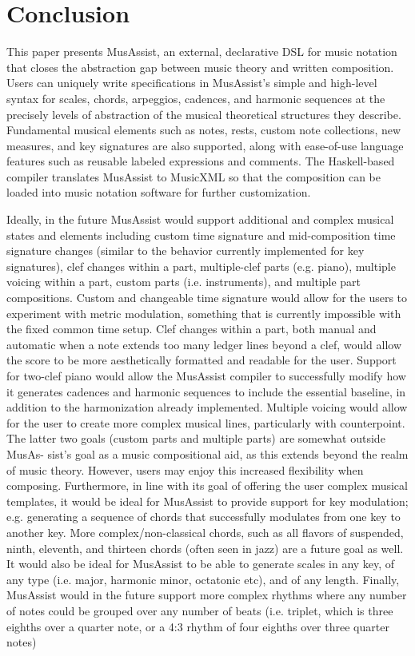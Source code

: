 \documentclass{article}
\begin{document}
\section{Conclusion}
This paper presents MusAssist, an external, declarative DSL for music notation that closes the abstraction gap between music theory and written composition. Users can uniquely write specifications in MusAssist's simple and high-level syntax for scales, chords, arpeggios, cadences, and harmonic sequences at the precisely levels of abstraction of the musical theoretical structures they describe. Fundamental musical elements such as notes, rests, custom note collections, new measures, and key signatures are also supported, along with ease-of-use language features such as reusable labeled expressions and comments. The Haskell-based compiler translates MusAssist to MusicXML so that the composition can be loaded into music notation software for further customization. 


Ideally, in the future MusAssist would support additional and  complex musical states and elements including
custom time signature and mid-composition time signature changes (similar to the behavior
currently implemented for key signatures), clef changes within a part, multiple-clef parts (e.g.
piano), multiple voicing within a part, custom parts (i.e. instruments), and multiple part compositions.
Custom and changeable time signature would allow for the users to experiment with metric modulation,
something that is currently impossible with the fixed common time setup. Clef changes within a
part, both manual and automatic when a note extends too many ledger lines beyond a clef, would
allow the score to be more aesthetically formatted and readable for the user. Support for two-clef piano
would allow the MusAssist compiler to successfully modify how it generates cadences and harmonic
sequences to include the essential baseline, in addition to the harmonization already implemented.
Multiple voicing would allow for the user to create more complex musical lines, particularly with
counterpoint. The latter two goals (custom parts and multiple parts) are somewhat outside MusAs-
sist’s goal as a music compositional aid, as this extends beyond the realm of music theory. However,
users may enjoy this increased flexibility when composing. Furthermore, in line with its goal of
offering the user complex musical templates, it would be ideal for MusAssist to provide support for
key modulation; e.g. generating a sequence of chords that successfully modulates from one key to
another key. More complex/non-classical chords, such as all flavors of suspended, ninth, eleventh,
and thirteen chords (often seen in jazz) are a future goal as well. It would also be ideal for MusAssist
to be able to generate scales in any key, of any type (i.e. major, harmonic minor, octatonic etc),
and of any length. Finally, MusAssist would in the future support more complex rhythms where
any number of notes could be grouped over any number of beats (i.e. triplet, which is three eighths
over a quarter note, or a 4:3 rhythm of four eighths over three quarter notes)
\end{document}
